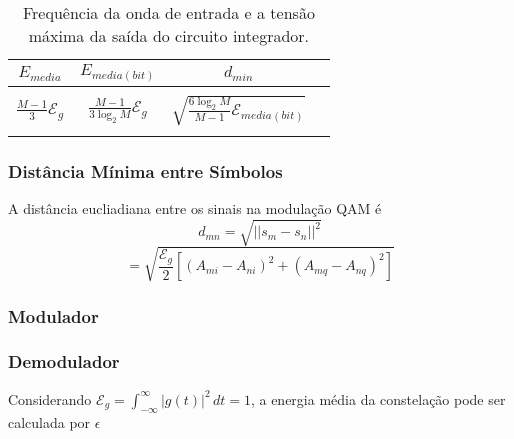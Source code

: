 \begin{table}[!ht]
    \centering
    \begin{tabular}{|c|c|c|c|}
    \hline
    $E_{media}$ & $E_{media(bit)}$ & $d_{min}$ \\ \hline
     &  &  \\ 
     $\frac{M-1}{3} \mathcal{E}_g$ & $ \frac{M-1}{3\log_2 M} \mathcal{E}_g$ & $\sqrt{\frac{6\log_2 M}{M-1} \mathcal{E}_{media(bit)}}$ \\ 
     &  &  \\ \hline
    \end{tabular}
    \caption{Frequência da onda de entrada e a tensão máxima da saída do circuito integrador.}
    \label{tab:QAM}
\end{table}

\subsubsection{Distância Mínima entre Símbolos}

A distância eucliadiana entre os sinais na modulação QAM é
$$ d_{mn} = \sqrt{|| s_m - s_n||^2}$$ 
$$ = \sqrt{\frac{\mathcal{E}_g}{2}[(A_{mi} - A_{ni})^2 + (A_{mq} - A_{nq})^2]}$$
\subsubsection{Modulador}

\subsubsection{Demodulador}

Considerando $\mathcal{E}_g = \int_{-\infty}^{\infty} |g(t)|^2 \,dt = 1$, a energia média da constelação pode ser calculada por $\epsilon$



